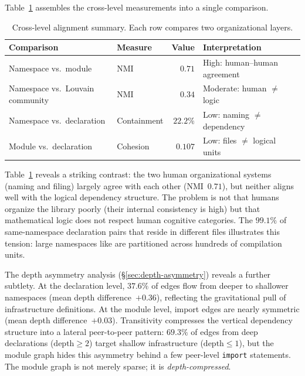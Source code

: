 Table~\ref{tab:three-layers-app} assembles the cross-level measurements into a single comparison.

\begin{table}[ht]
\centering
\caption{Cross-level alignment summary. Each row compares two organizational layers.}
\label{tab:three-layers-app}
\begin{tabular}{llrl}
\toprule
Comparison & Measure & Value & Interpretation \\
\midrule
Namespace vs.\ module            & NMI          & $0.71$  & High: human--human agreement \\
Namespace vs.\ Louvain community & NMI          & $0.34$  & Moderate: human $\neq$ logic \\
Namespace vs.\ declaration       & Containment  & $22.2\%$ & Low: naming $\neq$ dependency \\
Module vs.\ declaration          & Cohesion     & $0.107$ & Low: files $\neq$ logical units \\
\bottomrule
\end{tabular}
\end{table}

Table~\ref{tab:three-layers-app} reveals a striking contrast: the two human organizational systems (naming and filing) largely agree with each other (NMI~$0.71$), but neither aligns well with the logical dependency structure. The problem is not that humans organize the library poorly (their internal consistency is high) but that mathematical logic does not respect human cognitive categories. The $99.1\%$ of same-namespace declaration pairs that reside in different files illustrates this tension: large namespaces like  are partitioned across hundreds of compilation units.

The depth asymmetry analysis (\S\ref{sec:depth-asymmetry}) reveals a further subtlety. At the declaration level, $37.6\%$ of edges flow from deeper to shallower namespaces (mean depth difference~$+0.36$), reflecting the gravitational pull of infrastructure definitions. At the module level, import edges are nearly symmetric (mean depth difference~$+0.03$). Transitivity compresses the vertical dependency structure into a lateral peer-to-peer pattern: $69.3\%$ of edges from deep declarations ($\mathrm{depth} \ge 2$) target shallow infrastructure ($\mathrm{depth} \le 1$), but the module graph hides this asymmetry behind a few peer-level \texttt{import} statements. The module graph is not merely sparse; it is \emph{depth-compressed}.

